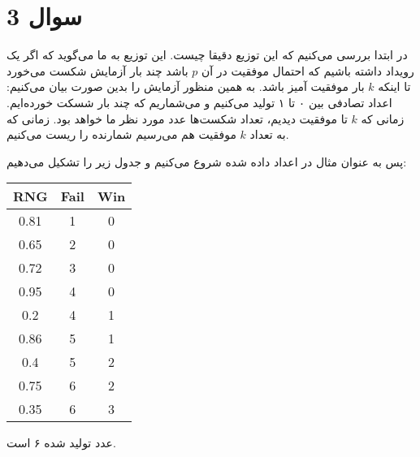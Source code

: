 \section*{سوال 3}
در ابتدا بررسی می‌کنیم که این توزیع دقیقا چیست. این توزیع به ما می‌گوید که اگر یک رویداد داشته باشیم که
احتمال موفقیت در آن
$p$
باشد چند بار آزمایش شکست می‌خورد تا اینکه
$k$
بار موفقیت آمیز باشد. به همین منظور آزمایش را بدین صورت بیان می‌کنیم:
اعداد تصادفی بین ۰ تا ۱ تولید می‌کنیم و می‌شماریم که چند بار شسکت خورده‌ایم. زمانی که
$k$
تا موفقیت دیدیم،‌ تعداد شکست‌ها عدد مورد نظر ما خواهد بود. زمانی که به تعداد
$k$
موفقیت هم می‌رسیم شمارنده را ریست می‌کنیم.

پس به عنوان مثال در اعداد داده شده شروع می‌کنیم و جدول زیر را تشکیل می‌دهیم:
\begin{latin}
    \centering
    \begin{tabular}{|c|c|c|}
        \hline
        RNG & Fail & Win\\
        \hline
        0.81 & 1 & 0\\
        0.65 & 2 & 0\\
        0.72 & 3 & 0\\
        0.95 & 4 & 0\\
        0.2 & 4 & 1\\
        0.86 & 5 & 1\\
        0.4 & 5 & 2\\
        0.75 & 6 & 2\\
        0.35 & 6 & 3\\
        \hline
    \end{tabular}
\end{latin}
عدد تولید شده ۶ است.
